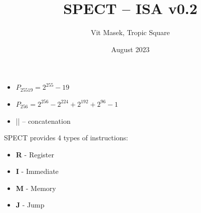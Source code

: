 \documentclass[notconfidential]{tropic_design_spec}
\title{SPECT -- ISA v0.2}
\author{Vit Masek, Tropic Square}
\date{August 2023}
\begin{document}
\def \projectname {SPECT}
\def \documentname {ISA v0.2}
\def \versionnumber {0.1}

\maketitle

\newcommand{\tspar}{\par\vspace{0.5cm}}
\newcommand{\tsspc}{\vspace{0.5cm}}
\newcommand{\tsblank}{\hspace*{0.5cm}}
\newcommand{\bi}[1]{\textbf{\textit{#1}}}

\newcommand{\tsnlind}{\newline\tsblank}

\newcommand{\tsif}{\textbf{\textit{if }}}
\newcommand{\tsthen}{\textbf{\textit{then: }}}
\newcommand{\tselse}{\newline\textbf{\textit{else: }}}



\begin{itemize}
    \item{$P_{25519} = 2^{255} - 19$}
    \item{$P_{256} = 2^{256} - 2^{224} + 2^{192} + 2^{96} - 1$}
    \item{|| -- concatenation}
\end{itemize}



SPECT provides 4 types of instructions:
\begin{itemize}
    \item{\textbf{R} - Register}
    \item{\textbf{I} - Immediate}
    \item{\textbf{M} - Memory}
    \item{\textbf{J} - Jump}
\end{itemize}
\end{document}
